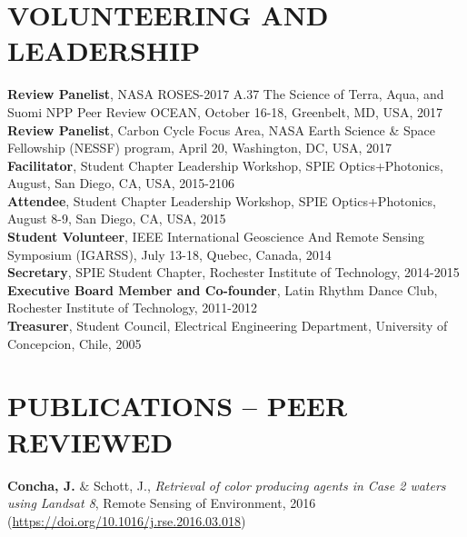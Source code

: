 \documentclass[11pt]{res} %
\begin{document}
\begin{resume}
\vspace{-0.1in}
\section{VOLUNTEERING AND LEADERSHIP}
\vspace{0.1in}
{\bf Review Panelist}, NASA ROSES-2017 A.37 The Science of Terra, Aqua, and Suomi NPP Peer Review OCEAN, October 16-18, Greenbelt, MD, USA, 2017
\vspace{0.1in}\\
{\bf Review Panelist}, Carbon Cycle Focus Area, NASA Earth Science \& Space Fellowship (NESSF) program, April 20, Washington, DC, USA, 2017
\vspace{0.1in}\\
{\bf Facilitator}, Student Chapter Leadership Workshop, SPIE Optics+Photonics, August, San Diego, CA, USA, 2015-2106
\vspace{0.1in}\\
{\bf Attendee}, Student Chapter Leadership Workshop, SPIE Optics+Photonics, August 8-9, San Diego, CA, USA, 2015
\vspace{0.1in}\\
{\bf Student Volunteer}, IEEE International Geoscience And Remote Sensing Symposium (IGARSS), July 13-18, Quebec, Canada, 2014
\vspace{0.1in}\\
{\bf Secretary}, SPIE Student Chapter, Rochester Institute of Technology, 2014-2015
\vspace{0.1in}\\
{\bf Executive Board Member and Co-founder}, Latin Rhythm Dance Club, Rochester Institute of Technology, 2011-2012
\vspace{0.1in}\\
{\bf Treasurer}, Student Council, Electrical Engineering Department, University of Concepcion, Chile, 2005\\

\vspace{-0.2in}
\section{PUBLICATIONS -- PEER REVIEWED}
\vspace{0.1in}
{\bf Concha, J.} $\&$ Schott, J., {\it Retrieval of color producing agents in Case 2 waters using Landsat 8}, Remote Sensing of Environment, 2016 (\url{https://doi.org/10.1016/j.rse.2016.03.018})\\


\end{resume}
\end{document}
